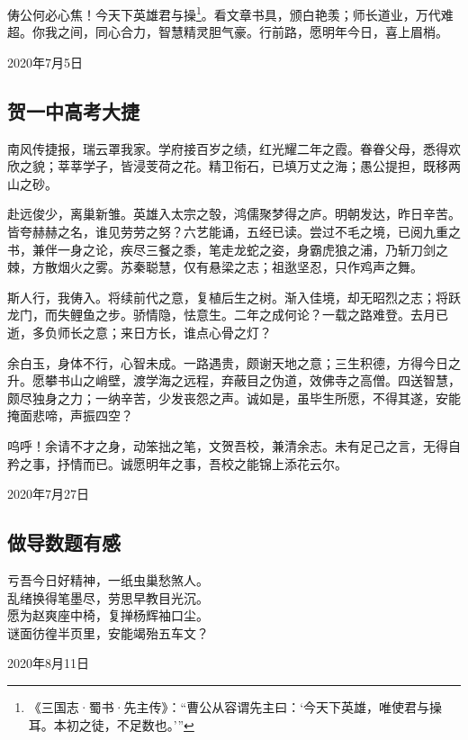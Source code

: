 \documentclass[a5paper]{ctexart}
\begin{document}
	俦公何必心焦！今天下英雄君与操\footnote{《三国志·蜀书·先主传》：“曹公从容谓先主曰：‘今天下英雄，唯使君与操耳。本初之徒，不足数也。’”}。看文章书具，颁白艳羡；师长道业，万代难超。你我之间，同心合力，智慧精灵胆气豪。行前路，愿明年今日，喜上眉梢。
	\begin{flushright}
		2020年7月5日
	\end{flushright}
	
	\subsection{贺一中高考大捷}
	南风传捷报，瑞云罩我家。学府接百岁之绩，红光耀二年之霞。眷眷父母，悉得欢欣之貌；莘莘学子，皆浸芰荷之花。精卫衔石，已填万丈之海；愚公提担，既移两山之砂。
	
	赴远俊少，离巢新雏。英雄入太宗之彀，鸿儒聚梦得之庐。明朝发达，昨日辛苦。皆夸赫赫之名，谁见劳劳之努？六艺能诵，五经已读。尝过不毛之境，已阅九重之书，兼伴一身之论，疾尽三餐之黍，笔走龙蛇之姿，身霸虎狼之浦，乃斩刀剑之棘，方散烟火之雾。苏秦聪慧，仅有悬梁之志；祖逖坚忍，只作鸡声之舞。
	
	斯人行，我俦入。将续前代之意，复植后生之树。渐入佳境，却无昭烈之志；将跃龙门，而失鲤鱼之步。骄情隐，怯意生。二年之成何论？一载之路难登。去月已逝，多负师长之意；来日方长，谁点心骨之灯？
	
	余白玉，身体不行，心智未成。一路遇贵，颇谢天地之意；三生积德，方得今日之升。愿攀书山之峭壁，渡学海之远程，弃蔽目之伪道，效佛寺之高僧。四送智慧，颇尽独身之力；一纳辛苦，少发丧怨之声。诚如是，虽毕生所愿，不得其遂，安能掩面悲啼，声振四空？
	
	呜呼！余请不才之身，动笨拙之笔，文贺吾校，兼清余志。未有足己之言，无得自矜之事，抒情而已。诚愿明年之事，吾校之能锦上添花云尔。
	\begin{flushright}
		2020年7月27日
	\end{flushright}
	
	\subsection{做导数题有感}
	\begin{center}
		亏吾今日好精神，一纸虫巢愁煞人。\\
		乱绪换得笔墨尽，劳思早教目光沉。\\
		愿为赵爽座中椅，复掸杨辉袖口尘。\\
		谜面彷徨半页里，安能竭殆五车文？
	\end{center}
	\begin{flushright}
		2020年8月11日
	\end{flushright}
\end{document}
